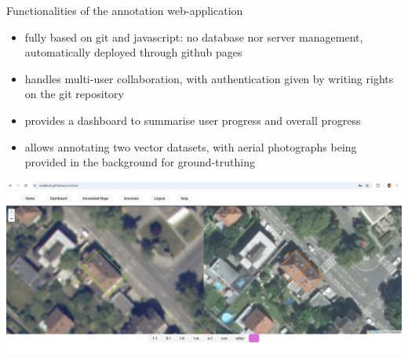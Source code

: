 \documentclass{beamer}
\begin{document}
\begin{frame}{Functionalities of the annotation web-application}


\footnotesize

\begin{itemize}
	\item fully based on git and javascript: no database nor server management, automatically deployed through github pages
	\item handles multi-user collaboration, with authentication given by writing rights on the git repository
	\item provides a dashboard to summarise user progress and overall progress
	\item allows annotating two vector datasets, with aerial photographs being provided in the background for ground-truthing
\end{itemize}

\smallskip


\begin{center}
  \includegraphics[width=\linewidth]{figures/annotator.png}
\end{center}



\end{frame}
\end{document}
